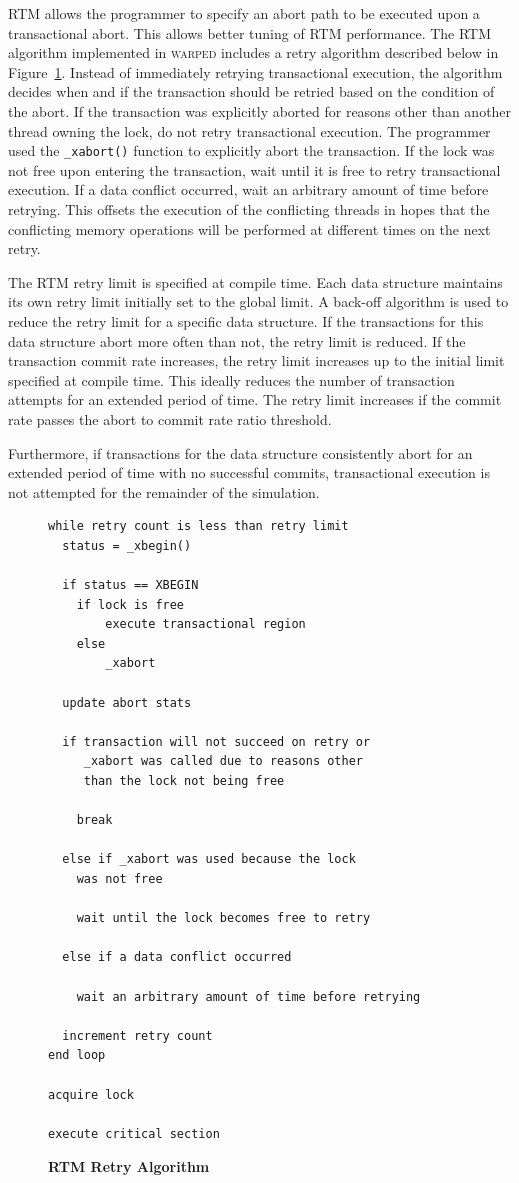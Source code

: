 \documentclass{sig-alternate}
\begin{document}
RTM allows the programmer to specify an abort path to be executed upon a transactional
abort.  This allows better tuning of RTM performance.  The RTM algorithm implemented in
\textsc{warped} includes a retry algorithm described below in Figure~\ref{rtm_retry}.
Instead of immediately retrying transactional execution, the algorithm decides when and if
the transaction should be retried based on the condition of the abort.  If the transaction
was explicitly aborted for reasons other than another thread owning the lock, do not retry
transactional execution.  The programmer used the \texttt{\_xabort()} function to
explicitly abort the transaction. If the lock was not free upon entering the transaction,
wait until it is free to retry transactional execution.  If a data conflict occurred, wait
an arbitrary amount of time before retrying.  This offsets the execution of the
conflicting threads in hopes that the conflicting memory operations will be performed at
different times on the next retry.

The RTM retry limit is specified at compile time.  Each data structure maintains its own
retry limit initially set to the global limit.  A back-off algorithm is used to reduce the
retry limit for a specific data structure.  If the transactions for this data structure
abort more often than not, the retry limit is reduced.  If the transaction commit rate
increases, the retry limit increases up to the initial limit specified at compile time.
This ideally reduces the number of transaction attempts for an extended period of time.
The retry limit increases if the commit rate passes the abort to commit rate ratio
threshold.

Furthermore, if transactions for the data structure consistently abort for an extended
period of time with no successful commits, transactional execution is not attempted for
the remainder of the simulation.

\begin{figure}
\begin{verbatim}
while retry count is less than retry limit
  status = _xbegin()

  if status == XBEGIN
    if lock is free
        execute transactional region
    else
        _xabort

  update abort stats

  if transaction will not succeed on retry or 
     _xabort was called due to reasons other 
     than the lock not being free

    break

  else if _xabort was used because the lock 
    was not free

    wait until the lock becomes free to retry

  else if a data conflict occurred
        
    wait an arbitrary amount of time before retrying

  increment retry count
end loop

acquire lock

execute critical section
\end{verbatim}
\caption{\textbf{RTM Retry Algorithm}}\label{rtm_retry}
\end{figure}
\end{document}
